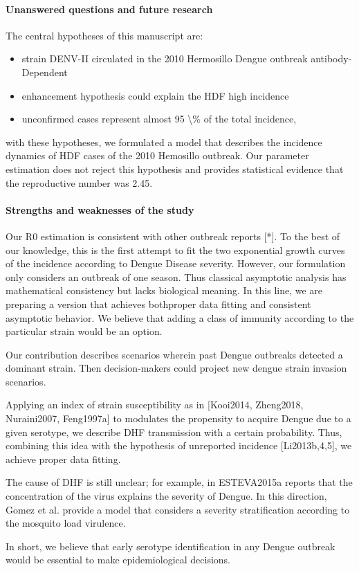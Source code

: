     \paragraph{Unanswered questions and future research}


        The central hypotheses of this manuscript are: 
        
    \begin{itemize}
        \item
            strain DENV-II
            circulated in the 2010 Hermosillo Dengue outbreak 
            antibody-Dependent
        \item
            enhancement hypothesis could explain the HDF high incidence
        \item
            unconfirmed cases represent almost \num{95 \%} 
            of the total incidence,        
    \end{itemize}
    with these hypotheses, we formulated a model that 
    describes the incidence dynamics of HDF cases of the 
    \num{2010} Hemosillo outbreak. Our parameter estimation does not reject
    this hypothesis and  provides statistical evidence that the reproductive 
    number was \num{2.45}.

    \paragraph{Strengths and weaknesses of the study} 
    Our R0 estimation is consistent with other outbreak reports [*].
    To the best of our knowledge, this is the first attempt to fit the 
    two exponential growth curves of the incidence according to Dengue 
    Disease severity. However, our formulation only considers an outbreak
    of one season. Thus classical asymptotic analysis has mathematical 
    consistency but lacks biological meaning.  In this line, we are preparing
    a version that achieves both\textemdash proper data fitting and consistent
    asymptotic behavior. We believe that adding a class of immunity according
    to the particular strain would be an option.

        Our contribution describes scenarios wherein past Dengue
    outbreaks detected a dominant  strain. Then decision-makers could
    project new dengue strain invasion scenarios.
     
        Applying an index of strain susceptibility as in  [Kooi2014,
    Zheng2018, Nuraini2007, Feng1997a] to modulates the propensity to
    acquire Dengue due to a given serotype,  we describe DHF transmission
    with a certain probability.  Thus, combining this idea with the
    hypothesis of unreported incidence [Li2013b,4,5], we achieve proper
    data fitting. 

        The cause of DHF is still unclear; for example, in ESTEVA2015a reports
    that the concentration of the virus explains the severity of Dengue.
    In this direction, Gomez et al. provide a model that considers a
    severity stratification according to the mosquito load virulence.

        In short, we believe that early serotype identification in any Dengue
    outbreak would be essential to  make epidemiological decisions.
